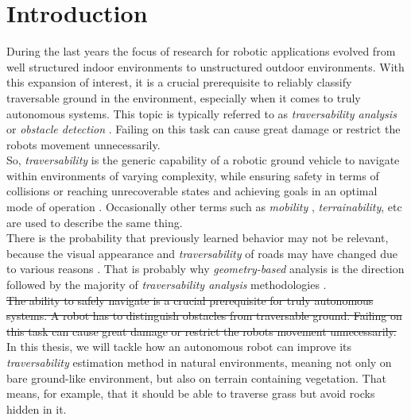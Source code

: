 \documentclass[12pt,a4paper]{report}
\newcommand{\term}{\textit}
\begin{document}
	{
		\hypersetup{linkcolor=black}
		\tableofcontents
	}
	
	\chapter{Introduction}
	\label{sec:intro}
	
	During the last years the focus of research for robotic applications evolved 
	from well structured indoor environments to unstructured outdoor environments. 
	With this expansion of interest, it is a crucial prerequisite to reliably 
	classify traversable ground in the environment, especially when it comes to 
	truly autonomous systems. This topic is typically referred to as 
	\term{traversability analysis} or \term{obstacle detection} \cite{Suger}. 
	Failing on this	task can cause great damage or restrict the robots movement 
	unnecessarily.
	\\
	
	So, \term{traversability} is the generic capability of a robotic ground 
	vehicle to navigate within environments of varying complexity, while ensuring 
	safety in terms of collisions or reaching unrecoverable states and achieving 
	goals in an optimal mode of operation \cite{Papadakis}. Occasionally other 
	terms such as \term{mobility} \cite{Lalonde}, \term{terrainability}, etc are 
	used to describe the same thing.
	\\
		
	There is the probability that previously learned behavior may not be relevant, 
	because the visual appearance and \term{traversability} of roads may have 
	changed due to various reasons \cite{Wigness}. That is probably why 
	\term{geometry-based} analysis is the direction followed by the majority of 
	\term{traversability analysis} methodologies \cite{Papadakis}.
	\\
	
	\sout{The ability to safely navigate is a crucial prerequisite for truly 
	autonomous systems. A robot has to distinguish obstacles from traversable 
	ground. Failing on this	task can cause great damage or restrict the robots 
	movement unnecessarily.}
	\\
	
	In this thesis, we will tackle how an autonomous robot can improve its 
	\term{traversability} estimation method in natural environments, meaning not 
	only on bare ground-like environment, but also on terrain containing vegetation. 
	That means, for example, that it should be able to traverse grass but avoid 
	rocks hidden in it.
	
\end{document}
